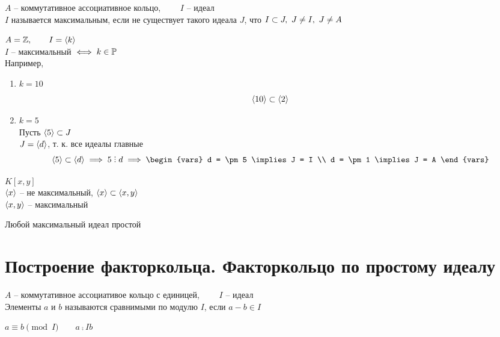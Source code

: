 \begin{definition}
	$ A $ -- коммутативное ассоциативное кольцо, $ \qquad I $ -- идеал \\
	$ I $ называется максимальным, если не существует такого идеала $ J $, что $ I \subset J, ~ J \ne I, ~ J \ne A $
\end{definition}

\begin{exmpls}
	\item $ A = \mathbb{Z}, \qquad I = \Braket{k} $ \\
	$ I $ -- максимальный $ \iff k \in \mathbb{P} $ \\
	Например,
	\begin{enumerate}
		\item $ k = 10 $
		$$ \Braket{10} \subset \Braket2 $$
		\item $ k = 5 $ \\
		Пусть $ \Braket5 \subset J $ \\
		$ J = \Braket{d} $, т. к. все идеалы главные
		$$ \braket5 \sub \braket{d} \implies 5 \divby d \implies
		\begin{vars}
			d = \pm 5 \implies J = I \\
			d = \pm 1 \implies J = A
		\end{vars} $$
	\end{enumerate}
	\item $ K[x, y] $ \\
	$ \Braket{x} $ -- не максимальный, $ \Braket{x} \subset \Braket{x, y} $ \\
	$ \Braket{x, y} $ -- максимальный
\end{exmpls}

\begin{remark}
	Любой максимальный идеал простой
\end{remark}

\section{Построение факторкольца. Факторкольцо по простому идеалу}

\begin{definition}
	$ A $ -- коммутативное ассоциативое кольцо с единицей, $ \qquad I $ -- идеал \\
	Элементы $ a $ и $ b $ называются сравнимыми по модулю $ I $, если $ a - b \in I $
\end{definition}

\begin{notation}
	$ a \equiv b \pmod I \qquad a \comp{I} b $
\end{notation}


